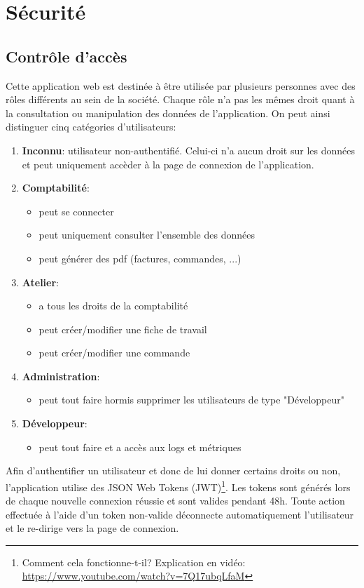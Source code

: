 \section{Sécurité}

\subsection{Contrôle d'accès}
Cette application web est destinée à être utilisée par plusieurs personnes avec des rôles différents au sein de la société. Chaque rôle n'a pas les mêmes droit quant à la consultation ou manipulation des données de l'application. On peut ainsi distinguer cinq catégories d'utilisateurs: 
\begin{enumerate}
  \item \textbf{Inconnu}: utilisateur non-authentifié. Celui-ci n'a aucun droit sur les données et peut uniquement accèder à la page de connexion de l'application. 
  \item \textbf{Comptabilité}: 
  \begin{itemize}
    \item peut se connecter
    \item peut uniquement consulter l'ensemble des données 
    \item peut générer des pdf (factures, commandes, ...)
  \end{itemize}
  \item \textbf{Atelier}: 
  \begin{itemize}
    \item a tous les droits de la comptabilité
    \item peut créer/modifier une fiche de travail
    \item peut créer/modifier une commande
  \end{itemize}
  \item \textbf{Administration}: 
  \begin{itemize}
    \item peut tout faire hormis supprimer les utilisateurs de type "Développeur"
  \end{itemize}
  \item \textbf{Développeur}: 
  \begin{itemize}
    \item peut tout faire et a accès aux logs et métriques
  \end{itemize}
\end{enumerate}

\newpara

Afin d'authentifier un utilisateur et donc de lui donner certains droits ou non, l'application utilise des JSON Web Tokens (JWT)\footnote{Comment cela fonctionne-t-il? Explication en vidéo: \url{https://www.youtube.com/watch?v=7Q17ubqLfaM}}. Les tokens sont générés lors de chaque nouvelle connexion réussie et sont valides pendant 48h. Toute action effectuée à l'aide d'un token non-valide déconnecte automatiquement l'utilisateur et le re-dirige vers la page de connexion. 

